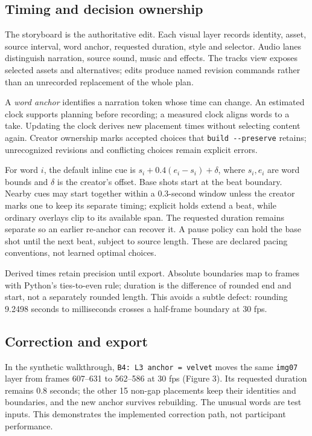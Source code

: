 \documentclass{ceurart}
\begin{document}
\subsection{Timing and decision
ownership}\label{timing-and-decision-ownership}

The storyboard is the authoritative edit. Each visual layer records
identity, asset, source interval, word anchor, requested duration, style
and selector. Audio lanes distinguish narration, source sound, music and
effects. The tracks view exposes selected assets and alternatives; edits
produce named revision commands rather than an unrecorded replacement of
the whole plan.

A \emph{word anchor} identifies a narration token whose time can change.
An estimated clock supports planning before recording; a measured clock
aligns words to a take. Updating the clock derives new placement times
without selecting content again. Creator ownership marks accepted
choices that \texttt{build\ -\/-preserve} retains; unrecognized
revisions and conflicting choices remain explicit errors.

For word \(i\), the default inline cue is \(s_i+0.4(e_i-s_i)+\delta\),
where \(s_i,e_i\) are word bounds and \(\delta\) is the creator's
offset. Base shots start at the beat boundary. Nearby cues may start
together within a 0.3-second window unless the creator marks one to keep
its separate timing; explicit holds extend a beat, while ordinary
overlays clip to its available span. The requested duration remains
separate so an earlier re-anchor can recover it. A pause policy can hold
the base shot until the next beat, subject to source length. These are
declared pacing conventions, not learned optimal choices.

Derived times retain precision until export. Absolute boundaries map to
frames with Python's ties-to-even rule; duration is the difference of
rounded end and start, not a separately rounded length. This avoids a
subtle defect: rounding 9.2498 seconds to milliseconds crosses a
half-frame boundary at 30 fps.

\subsection{Correction and export}\label{correction-and-export}

In the synthetic walkthrough, \texttt{B4:\ L3\ anchor\ =\ velvet} moves
the same \texttt{img07} layer from frames 607--631 to 562--586 at 30 fps
(Figure 3). Its requested duration remains 0.8 seconds; the other 15
non-gap placements keep their identities and boundaries, and the new
anchor survives rebuilding. The unusual words are test inputs. This
demonstrates the implemented correction path, not participant
performance.
\end{document}
